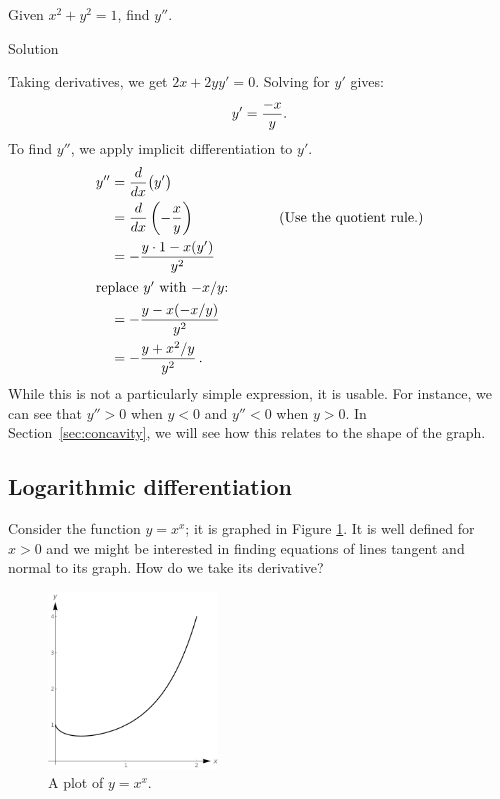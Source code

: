 \begin{example}\label{ex_implicit9}
Given $x^2+y^2=1$, find $ y''$. 

Solution 

Taking derivatives, we get $2x+2yy'=0$.  Solving for $y'$  gives: $$\displaystyle y' = \frac{-x}{y}.$$ To find $y''$, we apply implicit differentiation to $y'$.
\ifcalculus\allowdisplaybreaks\fi
\begin{align*}
y'' &= \frac{d}{dx}\big(y'\big) \\
		&= \frac{d}{dx}\left(-\frac xy\right)\qquad\qquad\qquad\text{(Use the quotient rule.)} \\
		&= -\frac{y\cdot1 - x(y')}{y^2} \\
\intertext{replace $y'$ with $-x/y$:}
		&= -\frac{y-x(-x/y)}{y^2}\\
		&= -\frac{y+x^2/y}{y^2}\,.
\end{align*}
While this is not a particularly simple expression, it is usable. For instance, we can see that $y''>0$ when $y<0$ and $y''<0$ when $y>0$. In Section~\ref{sec:concavity}, we will see how this relates to the shape of the graph.
\end{example}

\subsection{Logarithmic differentiation}


Consider the function $y=x^x$; it is graphed in Figure \ref{fig_diff_9}. It is well defined for $x>0$ and we might be interested in finding equations of lines tangent and normal to its graph. How do we take its derivative?


\begin{figure}[h]
	\begin{center}
			\includegraphics[width=0.4\textwidth]{fig_diff_9}
	\caption{A plot of $y=x^x$.}
	\label{fig_diff_9}
	\end{center}
\end{figure}


